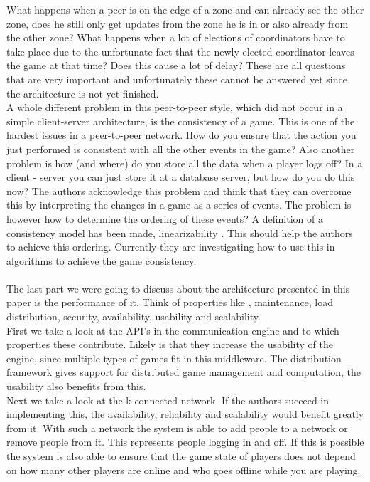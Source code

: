 What happens when a peer is on the edge of a zone and can already see the other zone, does he still only get updates from the zone he is in or also already from the other zone? 
What happens when a lot of elections of coordinators have to take place due to the unfortunate fact that the newly elected coordinator leaves the game at that time? 
Does this cause a lot of delay? 
These are all questions that are very important and unfortunately these cannot be answered yet since the architecture is not yet finished. \\
\indent A whole different problem in this peer-to-peer style, which did not occur in a simple client-server architecture, is the consistency of a game. 
This is one of the hardest issues in a peer-to-peer network. 
How do you ensure that the action you just performed is consistent with all the other events in the game? 
Also another problem is how (and where) do you store all the data when a player logs off? 
In a client - server you can just store it at a database server, but how do you do this now? 
The authors acknowledge this problem and think that they can overcome this by interpreting the changes in a game as a series of events. 
The problem is however how to determine the ordering of these events? 
A definition of a consistency model has been made, linearizability \cite{linear}. 
This should help the authors to achieve this ordering. 
Currently they are investigating how to use this in algorithms to achieve the game consistency.\\
\\
The last part we were going to discuss about the architecture presented in this paper is the performance of it. 
Think of properties like , maintenance, load distribution, security, availability, usability and scalability. \\
\indent First we take a look at the API's in the communication engine and to which properties these contribute. 
Likely is that they increase the usability of the engine, since multiple types of games fit in this middleware. 
The distribution framework gives support for distributed game management and computation, the usability also benefits from this.\\
\indent Next we take a look at the k-connected network. 
If the authors succeed in implementing this, the availability, reliability and scalability would benefit greatly from it. 
With such a network the system is able to add people to a network or remove people from it. 
This represents people logging in and off. 
If this is possible the system is also able to ensure that the game state of players does not depend on how many other players are online and who goes offline while you are playing. 

